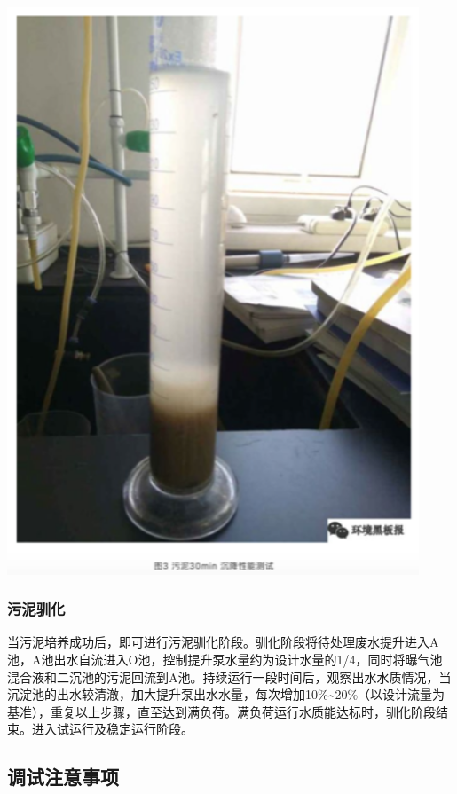 \documentclass[]{book}
\begin{document}
\includegraphics[width=4.83in]{images/ao3}

\hypertarget{ux6c61ux6ce5ux9a6fux5316}{%
\subsubsection{污泥驯化}\label{ux6c61ux6ce5ux9a6fux5316}}

当污泥培养成功后，即可进行污泥驯化阶段。驯化阶段将待处理废水提升进入A池，A池出水自流进入O池，控制提升泵水量约为设计水量的1/4，同时将曝气池混合液和二沉池的污泥回流到A池。持续运行一段时间后，观察出水水质情况，当沉淀池的出水较清澈，加大提升泵出水水量，每次增加10\%\textasciitilde{}20\%（以设计流量为基准），重复以上步骤，直至达到满负荷。满负荷运行水质能达标时，驯化阶段结束。进入试运行及稳定运行阶段。

\hypertarget{ux8c03ux8bd5ux6ce8ux610fux4e8bux9879}{%
\subsection{调试注意事项}\label{ux8c03ux8bd5ux6ce8ux610fux4e8bux9879}}
\end{document}
